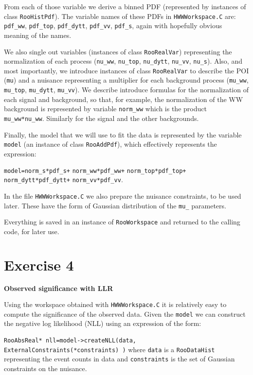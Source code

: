 \documentclass[a4paper,12pt]{article}
\begin{document}
From each of those variable we derive a binned PDF (represented by instances
of class \verb+RooHistPdf+). The variable names of these PDFs in
\verb+HWWWorkspace.C+ are: \verb+pdf_ww+, \verb+pdf_top+, \verb+pdf_dytt+,
\verb+pdf_vv+, \verb+pdf_s+, again with hopefully obvious meaning of the
names.

We also single out variables (instances of class \verb+RooRealVar+)
representing the normalization of each process (\verb+nu_ww+, \verb+nu_top+,
\verb+nu_dytt+, \verb+nu_vv+, \verb+nu_s+).
Also, and most importantly, we introduce instances of class \verb+RooRealVar+
to describe the POI (\verb+mu+) and a nuisance representing a multiplier for
each background process (\verb+mu_ww+, \verb+mu_top+,
\verb+mu_dytt+, \verb+mu_vv+).
We describe introduce formulas for the normalization of each signal and
background, so that, for example, the normalization of the WW background is
represented by variable \verb+norm_ww+ which is the product
\verb+mu_ww*nu_ww+. Similarly for the signal and the other backgrounds.

Finally, the model that we will use to fit the data is represented by the
variable \verb+model+ (an instance of class \verb!RooAddPdf!), which effectively represents the expression:

\verb!model=norm_s*pdf_s+! 
\verb!norm_ww*pdf_ww+! 
\verb!norm_top*pdf_top+!\\ 
\verb!norm_dytt*pdf_dytt+! 
\verb!norm_vv*pdf_vv!.

In the file \verb+HWWWorkspace.C+ we also prepare the nuisance constraints, to
be used later. These have the form of Gaussian distribution of the \verb+mu_+
parameters.

Everything is saved in an instance of \verb+RooWorkspace+ and returned to the
calling code, for later use.

\section*{Exercise 4}
{\bf Observed significance with LLR}

Using the workspace obtained with \verb+HWWWorkspace.C+ it is relatively easy
to compute the significance of the observed data.
Given the \verb+model+ we can construct the negative log likelihood (NLL) using an expression of
the form:

\verb+RooAbsReal* nll=model->createNLL(data, ExternalConstraints(*constraints) )+
where \verb+data+ is a \verb!RooDataHist! representing the event counts in data
and \verb+constraints+ is the set of Gaussian constraints on the nuisance.
\end{document}

